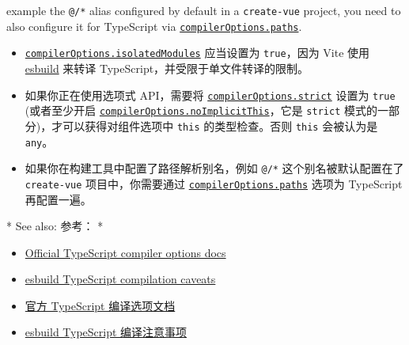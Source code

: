 \begin{paracol}{2}
\begin{itemize}
  example the \texttt{@/*} alias configured by default in a
  \texttt{create-vue} project, you need to also configure it for
  TypeScript via
  \href{https://www.typescriptlang.org/tsconfig\#paths}{\texttt{compilerOptions.paths}}.
\end{itemize}
\switchcolumn
\begin{itemize}
\item
  \href{https://www.typescriptlang.org/tsconfig\#isolatedModules}{\texttt{compilerOptions.isolatedModules}}
  应当设置为 \texttt{true}，因为 Vite 使用
  \href{https://esbuild.github.io/}{esbuild} 来转译
  TypeScript，并受限于单文件转译的限制。
\item
  如果你正在使用选项式 API，需要将
  \href{https://www.typescriptlang.org/tsconfig\#strict}{\texttt{compilerOptions.strict}}
  设置为 \texttt{true} (或者至少开启
  \href{https://www.typescriptlang.org/tsconfig\#noImplicitThis}{\texttt{compilerOptions.noImplicitThis}}，它是
  \texttt{strict} 模式的一部分)，才可以获得对组件选项中 \texttt{this}
  的类型检查。否则 \texttt{this} 会被认为是 \texttt{any}。
\item
  如果你在构建工具中配置了路径解析别名，例如 \texttt{@/*}
  这个别名被默认配置在了 \texttt{create-vue} 项目中，你需要通过
  \href{https://www.typescriptlang.org/tsconfig\#paths}{\texttt{compilerOptions.paths}}
  选项为 TypeScript 再配置一遍。
\end{itemize}
\switchcolumn[0]*%
See also:
\switchcolumn
参考：
\switchcolumn[0]*%
\begin{itemize}
\item
  \href{https://www.typescriptlang.org/docs/handbook/compiler-options.html}{Official
  TypeScript compiler options docs}
\item
  \href{https://esbuild.github.io/content-types/\#typescript-caveats}{esbuild
  TypeScript compilation caveats}
\end{itemize}
\switchcolumn
\begin{itemize}
\item
  \href{https://www.typescriptlang.org/docs/handbook/compiler-options.html}{官方
  TypeScript 编译选项文档}
\item
  \href{https://esbuild.github.io/content-types/\#typescript-caveats}{esbuild
  TypeScript 编译注意事项}
\end{itemize}
\end{paracol}



